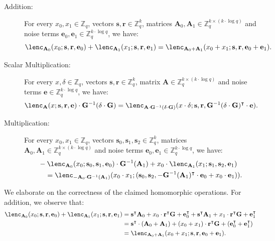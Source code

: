 \documentclass{theoretics}
\newcommand{\Z}{\mathbb{Z}}
\newenvironment{protocol}[1][]
{\begin{algorithm}\caption{#1}}
  {\end{algorithm}}
\begin{document}
\begin{protocol}[Homomorphic Operations on Lattice Encodings]\label{prot:Homomorphic}
\begin{description}
\item[Addition:] For every $x_0, x_1\in\Z_q$, vectors $\mathbf{s}, \mathbf{r}\in \Z_q^k$, matrices $\mathbf{A}_0, \mathbf{A}_1\in\Z_q^{k\times (k\cdot \log q)}$ and noise terms $\mathbf{e}_0, \mathbf{e}_1\in\Z_q^{k\cdot \log q}$, we have:
\[
\lenc_{\mathbf{A}_0} (x_0 ;\mathbf{s}, \mathbf{r}, \mathbf{e}_0) +
\lenc_{\mathbf{A}_1} (x_1;\mathbf{s}, \mathbf{r}, \mathbf{e}_1)
=
\lenc_{\mathbf{A}_0+ \mathbf{A}_1} (x_0+x_1; \mathbf{s}, \mathbf{r}, \mathbf{e}_0 +\mathbf{e}_1).
\]

\item[Scalar Multiplication:] For every $x, \delta\in\Z_q$, vectors $\mathbf{s}, \mathbf{r}\in \Z_q^k$, matrix $\mathbf{A}\in\Z_q^{k\times (k\cdot \log q)}$ and noise terms $\mathbf{e}\in\Z_q^{k\cdot \log q}$, we have:
\[
\lenc_\mathbf{A} (x; \mathbf{s}, \mathbf{r}, \mathbf{e}) \cdot \mathbf{G}^{-1}(\delta\cdot \mathbf{G})
=
\lenc_{\mathbf{A}\cdot \mathbf{G}^{-1}(\delta\cdot \mathbf{G})} (x\cdot \delta; \mathbf{s}, \mathbf{r}, \mathbf{G}^{-1}(\delta\cdot \mathbf{G})^\intercal\cdot\mathbf{e}).
\]

\item[Multiplication:] For every $x_0, x_1\in\Z_q$, vectors $\mathbf{s}_0, \mathbf{s}_1, \mathbf{s}_2\in \Z_q^k$, matrices $\mathbf{A}_0, \mathbf{A}_1\in\Z_q^{k\times (k\cdot \log q)}$ and noise terms $\mathbf{e}_0, \mathbf{e}_1\in\Z_q^{k\cdot \log q}$, we have:
\begin{align*}
&-\lenc_{\mathbf{A}_0}(x_0; \mathbf{s}_0, \mathbf{s}_1, \mathbf{e}_0) \cdot \mathbf{G}^{-1}(\mathbf{A}_1)+x_0\cdot \lenc_{\mathbf{A}_1}(x_1; \mathbf{s}_1, \mathbf{s}_2, \mathbf{e}_1)
\\
&\quad = \lenc_{-\mathbf{A}_0\cdot \mathbf{G}^{-1}(\mathbf{A}_1)}(x_0\cdot x_1; (\mathbf{s}_0, \mathbf{s}_2, -\mathbf{G}^{-1}(\mathbf{A}_1)^\intercal\cdot \mathbf{e}_0+x_0\cdot\mathbf{e}_1)).
\end{align*}
\end{description}
\end{protocol}
We elaborate on the correctness of the claimed homomorphic operations. For addition, we observe that:
\begin{align*}
    \lenc_{\mathbf{A}_0} (x_0 ;\mathbf{s}, \mathbf{r}, \mathbf{e}_0) +
\lenc_{\mathbf{A}_1} (x_1;\mathbf{s}, \mathbf{r}, \mathbf{e}_1)
&=\mathbf{s}^\intercal\mathbf{A}_0+x_0\cdot\mathbf{r}^\intercal \mathbf{G}+\mathbf{e}_0^\intercal+\mathbf{s}^\intercal\mathbf{A}_1+x_1\cdot\mathbf{r}^\intercal \mathbf{G}+\mathbf{e}_1^\intercal\\
&=\mathbf{s}^\intercal\cdot(\mathbf{A}_0+\mathbf{A}_1)+(x_0+x_1)\cdot\mathbf{r}^\intercal \mathbf{G}+(\mathbf{e}_0^\intercal+\mathbf{e}_1^\intercal)\\
    &=\lenc_{\mathbf{A}_0+ \mathbf{A}_1} (x_0+x_1; \mathbf{s}, \mathbf{r}, \mathbf{e}_0 +\mathbf{e}_1).
\end{align*}
\end{document}
